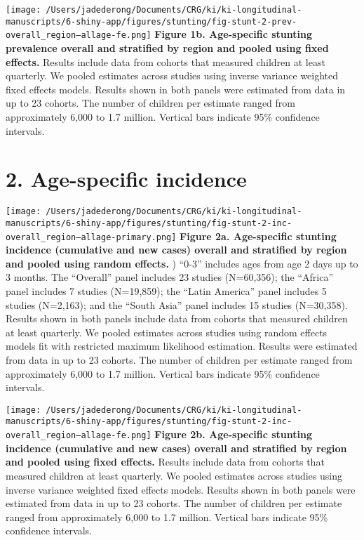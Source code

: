 \documentclass[9pt,]{article}
\begin{document}
\texttt{[image: /Users/jadederong/Documents/CRG/ki/ki-longitudinal-manuscripts/6-shiny-app/figures/stunting/fig-stunt-2-prev-overall\_region--allage-fe.png]}
\textbf{Figure 1b. Age-specific stunting prevalence overall and
stratified by region and pooled using fixed effects. } Results include
data from cohorts that measured children at least quarterly. We pooled
estimates across studies using inverse variance weighted fixed effects
models. Results shown in both panels were estimated from data in up to
23 cohorts. The number of children per estimate ranged from
approximately 6,000 to 1.7 million. Vertical bars indicate 95\%
confidence intervals.

\hypertarget{age-specific-incidence}{%
\section{2. Age-specific incidence}\label{age-specific-incidence}}

\texttt{[image: /Users/jadederong/Documents/CRG/ki/ki-longitudinal-manuscripts/6-shiny-app/figures/stunting/fig-stunt-2-inc-overall\_region--allage-primary.png]}
\textbf{Figure 2a. Age-specific stunting incidence (cumulative and new
cases) overall and stratified by region and pooled using random
effects.} ) ``0-3'' includes ages from age 2 days up to 3 months. The
``Overall'' panel includes 23 studies (N=60,356); the ``Africa'' panel
includes 7 studies (N=19,859); the ``Latin America'' panel includes 5
studies (N=2,163); and the ``South Asia'' panel includes 15 studies
(N=30,358). Results shown in both panels include data from cohorts that
measured children at least quarterly. We pooled estimates across studies
using random effects models fit with restricted maximum likelihood
estimation. Results were estimated from data in up to 23 cohorts. The
number of children per estimate ranged from approximately 6,000 to 1.7
million. Vertical bars indicate 95\% confidence intervals.

\texttt{[image: /Users/jadederong/Documents/CRG/ki/ki-longitudinal-manuscripts/6-shiny-app/figures/stunting/fig-stunt-2-inc-overall\_region--allage-fe.png]}
\textbf{Figure 2b. Age-specific stunting incidence (cumulative and new
cases) overall and stratified by region and pooled using fixed effects.}
Results include data from cohorts that measured children at least
quarterly. We pooled estimates across studies using inverse variance
weighted fixed effects models. Results shown in both panels were
estimated from data in up to 23 cohorts. The number of children per
estimate ranged from approximately 6,000 to 1.7 million. Vertical bars
indicate 95\% confidence intervals.
\end{document}
